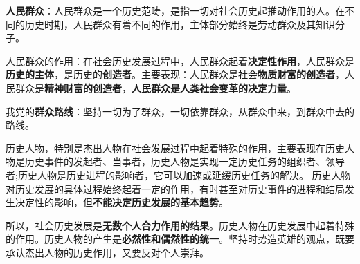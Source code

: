 \textbf{{人民群众}}：人民群众是一个历史范畴，是指一切对社会历史起推动作用的人。在不同的历史时期，人民群众有着不同的作用，{主体部分始终是劳动群众及其知识分子}。

{人民群众的作用：在社会历史发展过程中，人民群众起着}\textbf{{决定性作用}}{，人民群众是}\textbf{{历史的主体}}{，是历史的}\textbf{{创造者}}{。主要表现：人民群众是社会}\textbf{{物质财富的创造者}}{，人民群众是}\textbf{{精神财富的创造者}}{，}\textbf{{人民群众是人类社会变革的决定力量}}{。}

{我党的}\textbf{{群众路线}}{：坚持一切为了群众，一切依靠群众，从群众中来，到群众中去的路线。}

{历史人物，特别是杰出人物在社会发展过程中起着特殊的作用，主要表现在历史人物是历史事件的发起者、当事者，历史人物是实现一定历史任务的组织者、领导者;历史人物是历史进程的影响者，它可以加速或延缓历史任务的解决。
历史人物对历史发展的具体过程始终起着一定的作用，有时甚至对历史事件的进程和结局发生决定性的影响，但}\textbf{{不能决定历史发展的基本趋势}}{。}

{所以，社会历史发展是}\textbf{{无数个人合力作用的结果}}{。历史人物在历史发展中起着特殊的作用。历史人物的产生是}\textbf{{必然性和偶然性的统一}}{。坚持时势造英雄的观点，既要承认杰出人物的历史作用，又要反对个人崇拜。}
